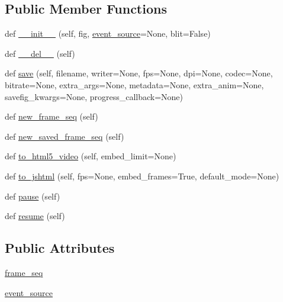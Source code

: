 \subsection*{Public Member Functions}
\begin{DoxyCompactItemize}
\item 
def \hyperlink{classmatplotlib_1_1animation_1_1Animation_ae37d92e1feb40bc1e99dbc67f19b63d0}{\+\_\+\+\_\+init\+\_\+\+\_\+} (self, fig, \hyperlink{classmatplotlib_1_1animation_1_1Animation_a7c178d14af9c70d7dc3de5dc78b7a70a}{event\+\_\+source}=None, blit=False)
\item 
def \hyperlink{classmatplotlib_1_1animation_1_1Animation_aa1367127973e0d011e9878a4826b8b66}{\+\_\+\+\_\+del\+\_\+\+\_\+} (self)
\item 
def \hyperlink{classmatplotlib_1_1animation_1_1Animation_a0a349e2b499cbd08b014a2bafb86a8f8}{save} (self, filename, writer=None, fps=None, dpi=None, codec=None, bitrate=None, extra\+\_\+args=None, metadata=None, extra\+\_\+anim=None, savefig\+\_\+kwargs=None, progress\+\_\+callback=None)
\item 
def \hyperlink{classmatplotlib_1_1animation_1_1Animation_a7758eb094d3aaae46842947d28fedc57}{new\+\_\+frame\+\_\+seq} (self)
\item 
def \hyperlink{classmatplotlib_1_1animation_1_1Animation_aca004f083f83ac7bdfd5401796cc104a}{new\+\_\+saved\+\_\+frame\+\_\+seq} (self)
\item 
def \hyperlink{classmatplotlib_1_1animation_1_1Animation_a531d83a2681bf63cdf173bd1ee660efb}{to\+\_\+html5\+\_\+video} (self, embed\+\_\+limit=None)
\item 
def \hyperlink{classmatplotlib_1_1animation_1_1Animation_a92a7136dc2e70f027d416bd0747851fb}{to\+\_\+jshtml} (self, fps=None, embed\+\_\+frames=True, default\+\_\+mode=None)
\item 
def \hyperlink{classmatplotlib_1_1animation_1_1Animation_a2e007cee4cebf13e23fc7d97dcbd6619}{pause} (self)
\item 
def \hyperlink{classmatplotlib_1_1animation_1_1Animation_ab48ae2a1cb4116bca127975df3cefe43}{resume} (self)
\end{DoxyCompactItemize}
\subsection*{Public Attributes}
\begin{DoxyCompactItemize}
\item 
\hyperlink{classmatplotlib_1_1animation_1_1Animation_a282fac725479a1151724a18a8fdce81d}{frame\+\_\+seq}
\item 
\hyperlink{classmatplotlib_1_1animation_1_1Animation_a7c178d14af9c70d7dc3de5dc78b7a70a}{event\+\_\+source}
\end{DoxyCompactItemize}


